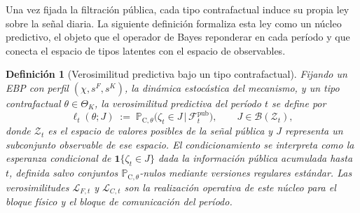 \documentclass[pdflatex,sn-mathphys-ay]{sn-jnl}
\theoremstyle{thmstyleone}
\theoremstyle{thmstyletwo}
\theoremstyle{thmstylethree}
\newtheorem{definition}{Definición}
\newcommand{\ProbC}[1]{\mathbb{P}_{\mathrm{C},#1}}
\newcommand{\ThetaK}{\Theta_K}
\newcommand{\1}{\mathbf{1}}
\begin{document}
Una vez fijada la filtración pública, cada tipo contrafactual induce su propia ley sobre la señal diaria. La siguiente definición formaliza esta ley como un núcleo predictivo, el objeto que el operador de Bayes reponderar en cada período y que conecta el espacio de tipos latentes con el espacio de observables.

\begin{definition}[Verosimilitud predictiva bajo un tipo contrafactual]\label{def:predictive-likelihood}
Fijando un EBP con perfil $(\chi,s^F,s^K)$, la dinámica estocástica del mecanismo, y un tipo contrafactual $\theta\in\ThetaK$, la verosimilitud predictiva del período $t$ se define por
\begin{equation}
\label{eq:likelihood-zeta}
\ell_t(\theta;J)\;:=\;\ProbC{\theta}\bigl(\zeta_t \in J \,\big|\, \mathcal{F}_t^{\mathrm{pub}}\bigr),
\qquad J\in\mathcal{B}(\mathcal{Z}_t),
\end{equation}
donde $\mathcal{Z}_t$ es el espacio de valores posibles de la señal pública y $J$ representa un subconjunto observable de ese espacio. El condicionamiento se interpreta como la esperanza condicional de $\mathbf{1}\{\zeta_t\in J\}$ dada la información pública acumulada hasta $t$, definida salvo conjuntos $\ProbC{\theta}$-nulos mediante versiones regulares estándar. Las verosimilitudes $\mathcal{L}_{F,t}$ y $\mathcal{L}_{C,t}$ son la realización operativa de este núcleo para el bloque físico y el bloque de comunicación del período.
\end{definition}
\end{document}
